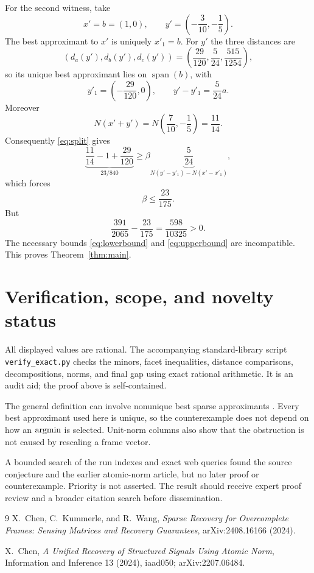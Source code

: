 \documentclass[11pt]{article}
\newcommand{\Span}{\operatorname{span}}
\begin{document}
\clearpage
For the second witness, take
\[
 x'=b=(1,0),\qquad y'=\left(-\frac3{10},-\frac15\right).
\]
The best approximant to $x'$ is uniquely $x'_1=b$. For $y'$ the three
distances are
\[
 (d_a(y'),d_b(y'),d_c(y'))
 =\left(\frac{29}{120},\frac5{24},\frac{515}{1254}\right),
\]
so its unique best approximant lies on $\Span(b)$, with
\[
 y'_1=\left(-\frac{29}{120},0\right),\qquad
 y'-y'_1=\frac5{24}a.
\]
Moreover
\[
 N(x'+y')=N\left(\frac7{10},-\frac15\right)=\frac{11}{14}.
\]
Consequently \eqref{eq:split} gives
\begin{equation}\label{eq:upper}
 \underbrace{\frac{11}{14}-1+\frac{29}{120}}_{23/840}
 \geq \beta\underbrace{\frac5{24}}_{N(y'-y'_1)-N(x'-x'_1)},
\end{equation}
which forces
\begin{equation}\label{eq:upperbound}
 \beta\leq\frac{23}{175}.
\end{equation}
But
\[
 \frac{391}{2065}-\frac{23}{175}=\frac{598}{10325}>0.
\]
The necessary bounds \eqref{eq:lowerbound} and \eqref{eq:upperbound} are
incompatible. This proves Theorem~\ref{thm:main}.

\section{Verification, scope, and novelty status}

All displayed values are rational. The accompanying standard-library script
\texttt{verify\_exact.py} checks the minors, facet inequalities,
distance comparisons, decompositions, norms, and final gap using exact
rational arithmetic. It is an audit aid; the proof above is self-contained.

The general definition can involve nonunique best sparse approximants
\cite{Chen}. Every best approximant used here is unique, so the counterexample
does not depend on how an $\mathop{\rm argmin}$ is selected. Unit-norm columns
also show that the obstruction is not caused by rescaling a frame vector.

A bounded search of the run indexes and exact web queries found the source
conjecture and the earlier atomic-norm article, but no later proof or
counterexample. Priority is not asserted. The result should receive expert
proof review and a broader citation search before dissemination.

\begin{thebibliography}{9}
X.~Chen, C.~Kummerle, and R.~Wang,
\emph{Sparse Recovery for Overcomplete Frames: Sensing Matrices and Recovery
Guarantees}, arXiv:2408.16166 (2024).

X.~Chen,
\emph{A Unified Recovery of Structured Signals Using Atomic Norm},
Information and Inference 13 (2024), iaad050; arXiv:2207.06484.
\end{thebibliography}
\end{document}
